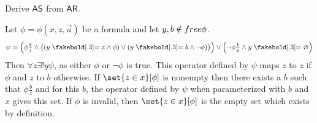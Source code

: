 \bexerc

    Derive ${\sf AS}$ from ${\sf AR}$.

\eexerc

Let $\phi=\phi(x,z,\vec a)$ be a formula and let $y,b\notin{\sl free}\phi$.
$$ \psi = \Bigl(\phi\tfrac bz\land\bigl((y\eq z\land\phi)\lor(y\eq b\land\neg\phi)\bigr)\Bigr)\lor\Bigl(\neg\phi\tfrac bx\land y\eq\varnothing\Bigr) $$
Then $\forall z\exists!y\psi$, as either $\phi$ or $\neg\phi$ is true.
This operator defined by $\psi$ maps $z$ to $z$ if $\phi$ and $z$ to $b$ otherwise.
If $\set{z\in x}[\phi]$ is nonempty then there exists a $b$ such that $\phi\tfrac bz$ and for this $b$, the operator defined by $\psi$ when parameterized with $b$ and $x$ gives this set.
If $\phi$ is invalid, then $\set{z\in x}[\phi]$ is the empty set which exists by definition.


